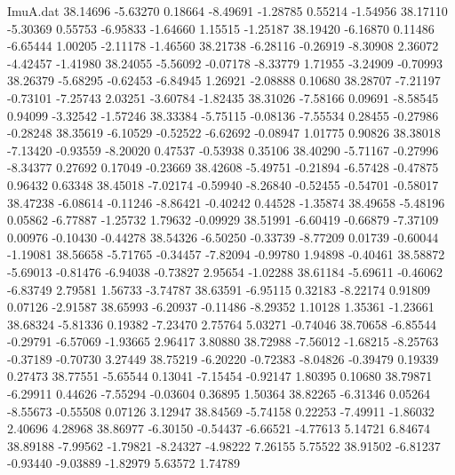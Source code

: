 \begin{filecontents}{ImuA.dat}
  38.14696   -5.63270    0.18664   -8.49691   -1.28785    0.55214   -1.54956
  38.17110   -5.30369    0.55753   -6.95833   -1.64660    1.15515   -1.25187
  38.19420   -6.16870    0.11486   -6.65444    1.00205   -2.11178   -1.46560
  38.21738   -6.28116   -0.26919   -8.30908    2.36072   -4.42457   -1.41980
  38.24055   -5.56092   -0.07178   -8.33779    1.71955   -3.24909   -0.70993
  38.26379   -5.68295   -0.62453   -6.84945    1.26921   -2.08888    0.10680
  38.28707   -7.21197   -0.73101   -7.25743    2.03251   -3.60784   -1.82435
  38.31026   -7.58166    0.09691   -8.58545    0.94099   -3.32542   -1.57246
  38.33384   -5.75115   -0.08136   -7.55534    0.28455   -0.27986   -0.28248
  38.35619   -6.10529   -0.52522   -6.62692   -0.08947    1.01775    0.90826
  38.38018   -7.13420   -0.93559   -8.20020    0.47537   -0.53938    0.35106
  38.40290   -5.71167   -0.27996   -8.34377    0.27692    0.17049   -0.23669
  38.42608   -5.49751   -0.21894   -6.57428   -0.47875    0.96432    0.63348
  38.45018   -7.02174   -0.59940   -8.26840   -0.52455   -0.54701   -0.58017
  38.47238   -6.08614   -0.11246   -8.86421   -0.40242    0.44528   -1.35874
  38.49658   -5.48196    0.05862   -6.77887   -1.25732    1.79632   -0.09929
  38.51991   -6.60419   -0.66879   -7.37109    0.00976   -0.10430   -0.44278
  38.54326   -6.50250   -0.33739   -8.77209    0.01739   -0.60044   -1.19081
  38.56658   -5.71765   -0.34457   -7.82094   -0.99780    1.94898   -0.40461
  38.58872   -5.69013   -0.81476   -6.94038   -0.73827    2.95654   -1.02288
  38.61184   -5.69611   -0.46062   -6.83749    2.79581    1.56733   -3.74787
  38.63591   -6.95115    0.32183   -8.22174    0.91809    0.07126   -2.91587
  38.65993   -6.20937   -0.11486   -8.29352    1.10128    1.35361   -1.23661
  38.68324   -5.81336    0.19382   -7.23470    2.75764    5.03271   -0.74046
  38.70658   -6.85544   -0.29791   -6.57069   -1.93665    2.96417    3.80880
  38.72988   -7.56012   -1.68215   -8.25763   -0.37189   -0.70730    3.27449
  38.75219   -6.20220   -0.72383   -8.04826   -0.39479    0.19339    0.27473
  38.77551   -5.65544    0.13041   -7.15454   -0.92147    1.80395    0.10680
  38.79871   -6.29911    0.44626   -7.55294   -0.03604    0.36895    1.50364
  38.82265   -6.31346    0.05264   -8.55673   -0.55508    0.07126    3.12947
  38.84569   -5.74158    0.22253   -7.49911   -1.86032    2.40696    4.28968
  38.86977   -6.30150   -0.54437   -6.66521   -4.77613    5.14721    6.84674
  38.89188   -7.99562   -1.79821   -8.24327   -4.98222    7.26155    5.75522
  38.91502   -6.81237   -0.93440   -9.03889   -1.82979    5.63572    1.74789

\end{filecontents}
